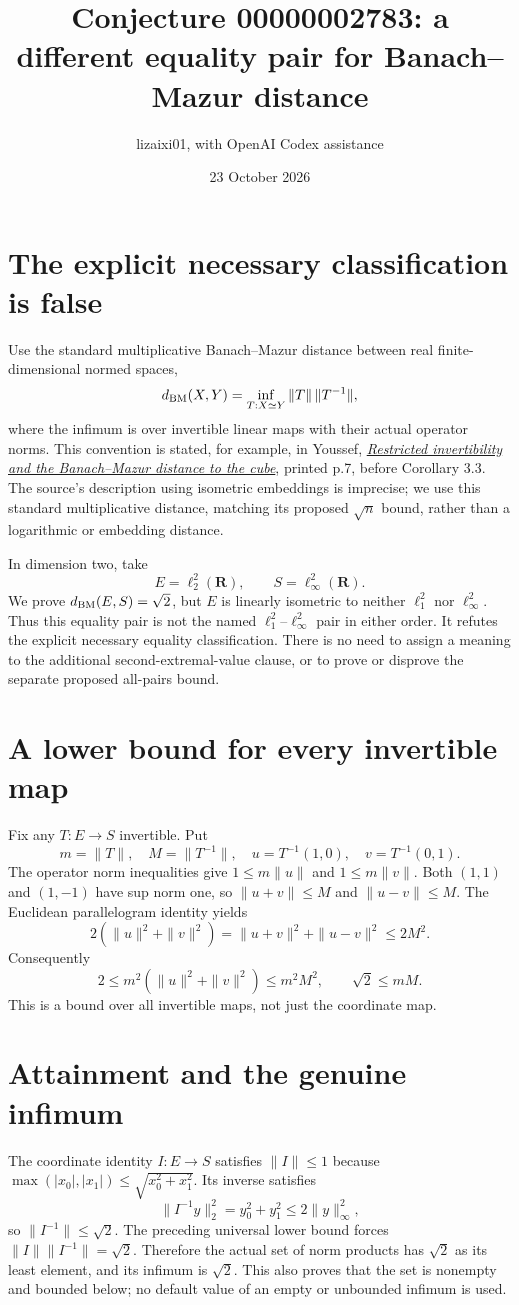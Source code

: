 \documentclass[11pt]{article}
\title{Conjecture 00000002783: a different equality pair for Banach--Mazur distance}
\author{lizaixi01, with OpenAI Codex assistance}
\date{23 October 2026}
\begin{document}
\maketitle
\section{The explicit necessary classification is false}
Use the standard multiplicative Banach--Mazur distance between real
finite-dimensional normed spaces,
\[
 d_{\rm BM}(X,Y)=\inf_{T:X\simeq Y}\|T\|\,\|T^{-1}\|,
\]
where the infimum is over invertible linear maps with their actual
operator norms. This convention is stated, for example, in Youssef,
\href{https://arxiv.org/abs/1206.0654}
{\emph{Restricted invertibility and the Banach--Mazur distance to the
cube}}, printed p.7, before Corollary 3.3. The source's description
using isometric embeddings is imprecise; we use this standard
multiplicative distance, matching its proposed $\sqrt n$ bound,
rather than a logarithmic or embedding distance.

In dimension two, take
\[
 E=\ell_2^2(\mathbf R),\qquad S=\ell_\infty^2(\mathbf R).
\]
We prove $d_{\rm BM}(E,S)=\sqrt2$, but $E$ is linearly isometric to
neither $\ell_1^2$ nor $\ell_\infty^2$. Thus this equality pair is
not the named $\ell_1^2$--$\ell_\infty^2$ pair in either order.
It refutes the explicit necessary equality classification. There
is no need to assign a meaning to the additional second-extremal-value
clause, or to prove or disprove the separate proposed all-pairs bound.

\section{A lower bound for every invertible map}
Fix any $T:E\to S$ invertible. Put
\[
 m=\|T\|,\quad M=\|T^{-1}\|,\quad
 u=T^{-1}(1,0),\quad v=T^{-1}(0,1).
\]
The operator norm inequalities give
$1\le m\|u\|$ and $1\le m\|v\|$.
Both $(1,1)$ and $(1,-1)$ have sup norm one, so
$\|u+v\|\le M$ and $\|u-v\|\le M$.
The Euclidean parallelogram identity yields
\[
 2(\|u\|^2+\|v\|^2)
   =\|u+v\|^2+\|u-v\|^2\le2M^2.
\]
Consequently
\[
 2\le m^2(\|u\|^2+\|v\|^2)\le m^2M^2,
 \qquad \sqrt2\le mM.
\]
This is a bound over all invertible maps, not just the coordinate map.

\newpage
\section{Attainment and the genuine infimum}
The coordinate identity $I:E\to S$ satisfies $\|I\|\le1$ because
$\max(|x_0|,|x_1|)\le\sqrt{x_0^2+x_1^2}$. Its inverse satisfies
\[
 \|I^{-1}y\|_2^2=y_0^2+y_1^2\le2\|y\|_\infty^2,
\]
so $\|I^{-1}\|\le\sqrt2$.
The preceding universal lower bound forces
$\|I\|\|I^{-1}\|=\sqrt2$.
Therefore the actual set of norm products has $\sqrt2$ as its
least element, and its infimum is $\sqrt2$.
This also proves that the set is nonempty and bounded below;
no default value of an empty or unbounded infimum is used.
\end{document}
